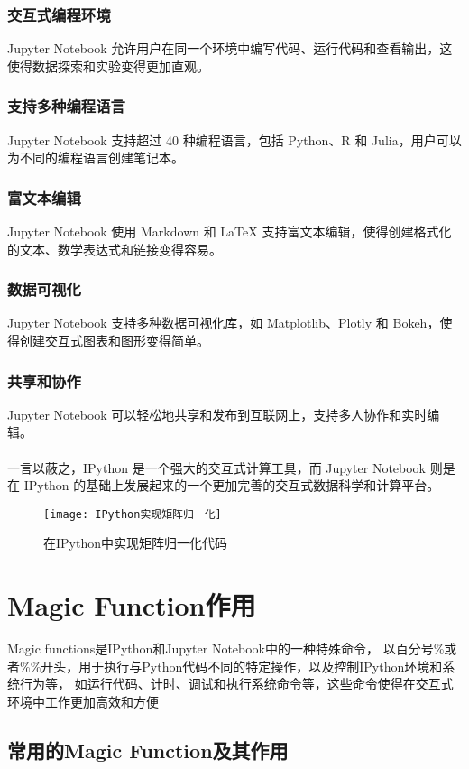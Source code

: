 \documentclass[10pt]{article}
\begin{document}
	\subsubsection{交互式编程环境}Jupyter Notebook 允许用户在同一个环境中编写代码、运行代码和查看输出，这使得数据探索和实验变得更加直观。
	\subsubsection{支持多种编程语言}Jupyter Notebook 支持超过 40 种编程语言，包括 Python、R 和 Julia，用户可以为不同的编程语言创建笔记本。
	\subsubsection{富文本编辑}Jupyter Notebook 使用 Markdown 和 LaTeX 支持富文本编辑，使得创建格式化的文本、数学表达式和链接变得容易。
	\subsubsection{数据可视化}Jupyter Notebook 支持多种数据可视化库，如 Matplotlib、Plotly 和 Bokeh，使得创建交互式图表和图形变得简单。
	\subsubsection{共享和协作}Jupyter Notebook 可以轻松地共享和发布到互联网上，支持多人协作和实时编辑。\paragraph{}
	一言以蔽之，IPython 是一个强大的交互式计算工具，而 Jupyter Notebook 则是在 IPython 的基础上发展起来的一个更加完善的交互式数据科学和计算平台。
	\begin{figure}[H]
		\centering
		\texttt{[image: IPython实现矩阵归一化]}
		\caption{在IPython中实现矩阵归一化代码}
	\end{figure}
	
	
	\section{Magic Function作用}
	Magic functions是IPython和Jupyter Notebook中的一种特殊命令，
	以百分号\%或者\%\%开头，用于执行与Python代码不同的特定操作，以及控制IPython环境和系统行为等，
	如运行代码、计时、调试和执行系统命令等，这些命令使得在交互式环境中工作更加高效和方便
	\subsection{常用的Magic Function及其作用}
\end{document}
